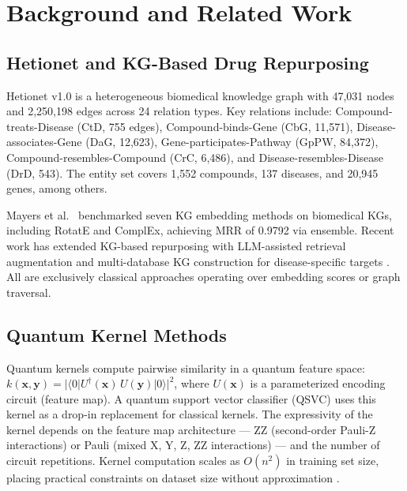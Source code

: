 \documentclass[10pt,twocolumn]{article}
\begin{document}
\section{Background and Related Work}

\subsection{Hetionet and KG-Based Drug Repurposing}

Hetionet v1.0 \cite{himmelstein2017} is a heterogeneous biomedical knowledge graph with 47,031 nodes and 2,250,198 edges across 24 relation types. Key relations include: Compound-treats-Disease (CtD, 755 edges), Compound-binds-Gene (CbG, 11,571), Disease-associates-Gene (DaG, 12,623), Gene-participates-Pathway (GpPW, 84,372), Compound-resembles-Compound (CrC, 6,486), and Disease-resembles-Disease (DrD, 543). The entity set covers 1,552 compounds, 137 diseases, and 20,945 genes, among others.

Mayers et al.\ \cite{mayers2023} benchmarked seven KG embedding methods on biomedical KGs, including RotatE and ComplEx, achieving MRR of 0.9792 via ensemble. Recent work has extended KG-based repurposing with LLM-assisted retrieval augmentation \cite{llmrag2025} and multi-database KG construction for disease-specific targets \cite{quantum2026}. All are exclusively classical approaches operating over embedding scores or graph traversal.

\subsection{Quantum Kernel Methods}

Quantum kernels compute pairwise similarity in a quantum feature space: $k(\mathbf{x}, \mathbf{y}) = |\langle 0 | U^\dagger(\mathbf{x})\, U(\mathbf{y}) | 0 \rangle|^2$, where $U(\mathbf{x})$ is a parameterized encoding circuit (feature map). A quantum support vector classifier (QSVC) uses this kernel as a drop-in replacement for classical kernels. The expressivity of the kernel depends on the feature map architecture --- ZZ (second-order Pauli-Z interactions) or Pauli (mixed X, Y, Z, ZZ interactions) --- and the number of circuit repetitions. Kernel computation scales as $O(n^2)$ in training set size, placing practical constraints on dataset size without approximation \cite{schuld2021}.
\end{document}
